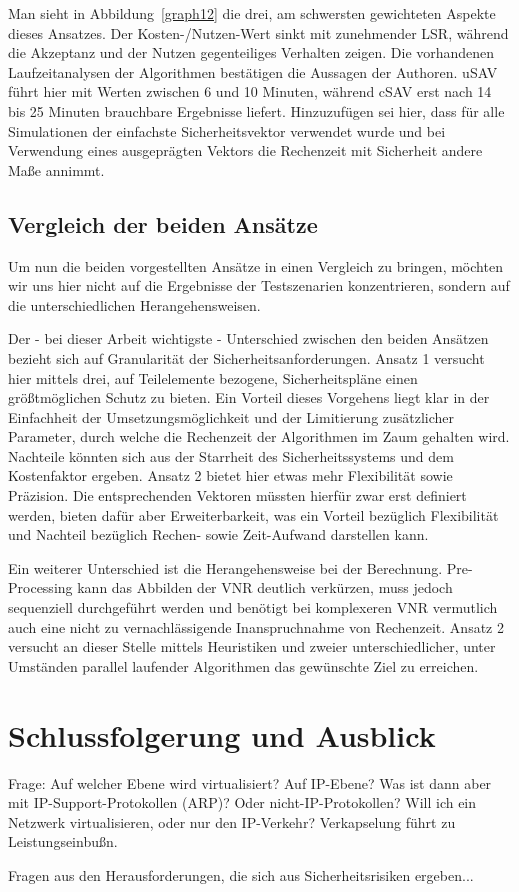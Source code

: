 \documentclass{lni}
\begin{document}
Man sieht in Abbildung~\ref{graph12} die drei, am schwersten gewichteten Aspekte dieses Ansatzes. Der Kosten-/Nutzen-Wert sinkt mit zunehmender LSR, während die Akzeptanz und der Nutzen gegenteiliges Verhalten zeigen. Die vorhandenen Laufzeitanalysen der Algorithmen bestätigen die Aussagen der Authoren. uSAV führt hier mit Werten zwischen 6 und 10 Minuten, während cSAV erst nach 14 bis 25 Minuten brauchbare Ergebnisse liefert. Hinzuzufügen sei hier, dass für alle Simulationen der einfachste Sicherheitsvektor verwendet wurde und bei Verwendung eines ausgeprägten Vektors die Rechenzeit mit Sicherheit andere Maße annimmt.


\subsection{Vergleich der beiden Ansätze}
\label{subsec:svne_vergleich}

Um nun die beiden vorgestellten Ansätze in einen Vergleich zu bringen, möchten wir uns hier nicht auf die Ergebnisse der Testszenarien konzentrieren, sondern auf die unterschiedlichen Herangehensweisen.

Der - bei dieser Arbeit wichtigste - Unterschied zwischen den beiden Ansätzen bezieht sich auf Granularität der Sicherheitsanforderungen. Ansatz 1 versucht hier mittels drei, auf Teilelemente bezogene, Sicherheitspläne einen größtmöglichen Schutz zu bieten. Ein Vorteil dieses Vorgehens liegt klar in der Einfachheit der Umsetzungsmöglichkeit und der Limitierung zusätzlicher Parameter, durch welche die Rechenzeit der Algorithmen im Zaum gehalten wird. Nachteile könnten sich aus der Starrheit des Sicherheitssystems und dem Kostenfaktor ergeben. Ansatz 2 bietet hier etwas mehr Flexibilität sowie Präzision. Die entsprechenden Vektoren müssten hierfür zwar erst definiert werden, bieten dafür aber Erweiterbarkeit, was ein Vorteil bezüglich Flexibilität und Nachteil bezüglich Rechen- sowie Zeit-Aufwand darstellen kann.

Ein weiterer Unterschied ist die Herangehensweise bei der Berechnung. Pre-Processing kann das Abbilden der VNR deutlich verkürzen, muss jedoch sequenziell durchgeführt werden und benötigt bei komplexeren VNR vermutlich auch eine nicht zu vernachlässigende Inanspruchnahme von Rechenzeit. Ansatz 2 versucht an dieser Stelle mittels Heuristiken und zweier unterschiedlicher, unter Umständen parallel laufender Algorithmen das gewünschte Ziel zu erreichen.


\section{Schlussfolgerung und Ausblick}
\label{sec:schluss}
Frage: Auf welcher Ebene wird virtualisiert? Auf IP-Ebene? Was ist dann aber mit IP-Support-Protokollen (ARP)? Oder nicht-IP-Protokollen? Will ich ein Netzwerk virtualisieren, oder nur den IP-Verkehr? Verkapselung führt zu Leistungseinbußn. \cite{cabuk2007towards}

Fragen aus den Herausforderungen, die sich aus Sicherheitsrisiken ergeben...



\nocite{fischer2011position}


{}
\end{document}
